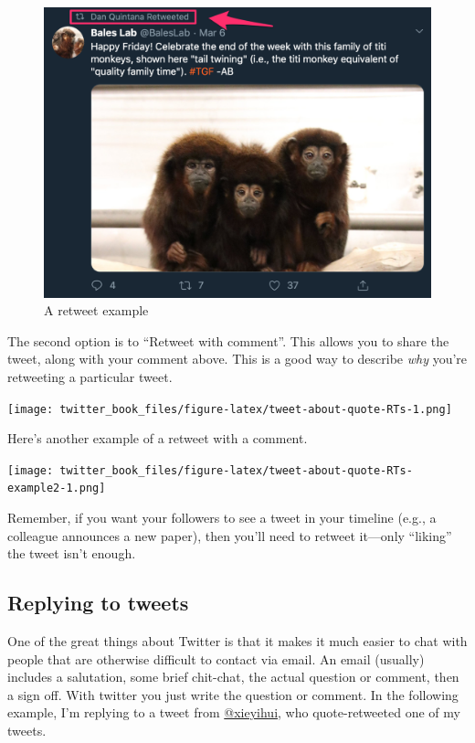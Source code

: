 \documentclass[
]{book}
\begin{document}
\begin{figure}

\includegraphics[width=0.8\linewidth]{images/retweet} \hfill{}

\caption{A retweet example}\label{fig:unnamed-chunk-9}
\end{figure}

The second option is to ``Retweet with comment''. This allows you to share the tweet, along with your comment above. This is a good way to describe \emph{why} you're retweeting a particular tweet.

\texttt{[image: twitter\_book\_files/figure-latex/tweet-about-quote-RTs-1.png]}

Here's another example of a retweet with a comment.

\texttt{[image: twitter\_book\_files/figure-latex/tweet-about-quote-RTs-example2-1.png]}

Remember, if you want your followers to see a tweet in your timeline (e.g., a colleague announces a new paper), then you'll need to retweet it---only ``liking'' the tweet isn't enough.

\hypertarget{replying-to-tweets}{%
\subsection{Replying to tweets}\label{replying-to-tweets}}

One of the great things about Twitter is that it makes it much easier to chat with people that are otherwise difficult to contact via email. An email (usually) includes a salutation, some brief chit-chat, the actual question or comment, then a sign off. With twitter you just write the question or comment. In the following example, I'm replying to a tweet from \href{https://twitter.com/xieyihui}{@xieyihui}, who quote-retweeted one of my tweets.
\end{document}
